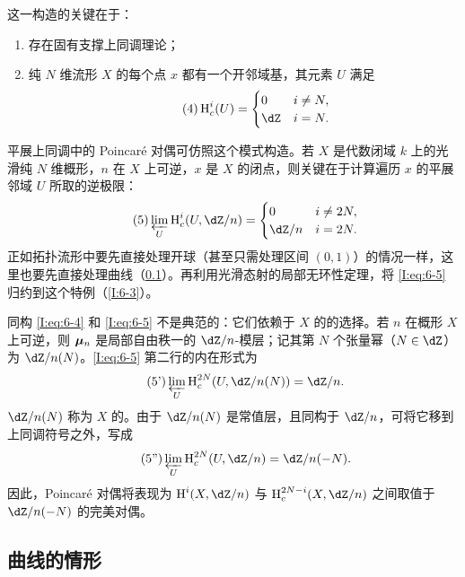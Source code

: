 这一构造的关键在于：
\begin{enumerate}[\indent a)]
\item 存在固有支撑上同调理论；
\item 纯 $N$ 维流形 $X$ 的每个点 $x$ 都有一个开邻域基，其元素 $U$ 满足
\begin{equation*}\tag{4}\label{I:eq:6-4}
\h_c^i(U)=\begin{cases}0&i\ne N,\\\dZ&i=N.\end{cases}
\end{equation*}
\end{enumerate}
平展上同调中的 Poincaré 对偶可仿照这个模式构造。若 $X$ 是代数闭域 $k$ 上的光滑纯 $N$ 维概形，$n$ 在 $X$ 上可逆，$x$ 是 $X$ 的闭点，则关键在于计算遍历 $x$ 的平展邻域 $U$ 所取的逆极限：
\begin{equation*}\tag{5}\label{I:eq:6-5}
\varprojlim_U\h_c^i(U,\dZ/n)=
\begin{cases}0&i\ne2N,\\\dZ/n&i=2N.\end{cases}
\end{equation*}
正如拓扑流形中要先直接处理开球（甚至只需处理区间 $(0,1)$）的情况一样，这里也要先直接处理曲线（\ref{I:6-2}）。再利用光滑态射的局部无环性定理，将 \eqref{I:eq:6-5} 归约到这个特例（\ref{I:6-3}）。

同构 \eqref{I:eq:6-4} 和 \eqref{I:eq:6-5} 不是典范的：它们依赖于 $X$ 的的选择。若 $n$ 在概形 $X$ 上可逆，则 ${\bm\mu}_n$ 是局部自由秩一的 $\dZ/n$-模层；记其第 $N$ 个张量幂（$N\in\dZ$）为 $\dZ/n(N)$。\eqref{I:eq:6-5} 第二行的内在形式为
\begin{equation*}\tag{5'}\label{I:eq:6-5'}
\varprojlim_U\h_c^{2N}(U,\dZ/n(N))=\dZ/n.
\end{equation*}
$\dZ/n(N)$ 称为 $X$ 的。由于 $\dZ/n(N)$ 是常值层，且同构于 $\dZ/n$，可将它移到上同调符号之外，写成
\begin{equation*}\tag{5''}\label{I:eq:6-5''}
\varprojlim_U\h_c^{2N}(U,\dZ/n)=\dZ/n(-N).
\end{equation*}
因此，Poincaré 对偶将表现为 $\h^i(X,\dZ/n)$ 与 $\h_c^{2N-i}(X,\dZ/n)$ 之间取值于 $\dZ/n(-N)$ 的完美对偶。

\subsection{曲线的情形}\label{I:6-2}
